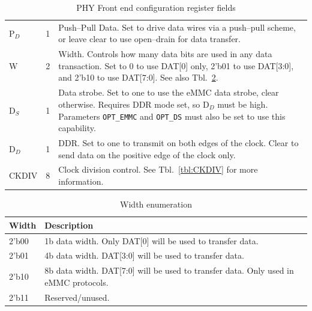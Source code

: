\documentclass{gqtekspec}
\begin{document}
\begin{table}
\begin{center}
\begin{tabular}{|p{1.2in}|p{0.5in}|p{4.0in}|}
	\\
P$_D$ & 1 & Push--Pull Data.  Set to drive data wires via a push--pull
	scheme, or leave clear to use open--drain for data transfer.
	\\
%
%
W & 2 & Width.  Controls how many data bits are used in any data transaction.
	Set to 0 to use DAT[0] only, 2'b01 to use DAT[3:0], and 2'b10 to use
	DAT[7:0].  See also Tbl.~\ref{tbl:PHY-WIDTH}. \\
D$_S$&1& Data strobe.  Set to one to use the eMMC data strobe, clear
	otherwise.  Requires DDR mode set, so D$_D$ must be high.  Parameters
	{\tt OPT\_EMMC} and {\tt OPT\_DS} must also be set to use this
	capability.\\
D$_D$ & 1 & DDR.  Set to one to transmit on both edges of the clock.  Clear
	to send data on the positive edge of the clock only. \\
CKDIV & 8 & Clock division control.  See Tbl.~\ref{tbl:CKDIV} for more
	information.
	\\\hline
\end{tabular}
\caption{PHY Front end configuration register fields}\label{tbl:PHY}
\end{center}\end{table}

\begin{table}\begin{center}
\begin{tabular}{|p{1.2in}|p{4.0in}|}\hline
	\rowcolor[gray]{0.85} Width & Description\\\hline\hline
2'b00 & 1b data width.  Only DAT[0] will be used to transfer data.\\
2'b01 & 4b data width.  DAT[3:0] will be used to transfer data.\\
2'b10 & 8b data width.  DAT[7:0] will be used to transfer data.  Only used in
	eMMC protocols.\\
2'b11 & Reserved/unused.  \\\hline
\end{tabular}
\caption{Width enumeration}\label{tbl:PHY-WIDTH}
\end{center}\end{table}
\end{document}

